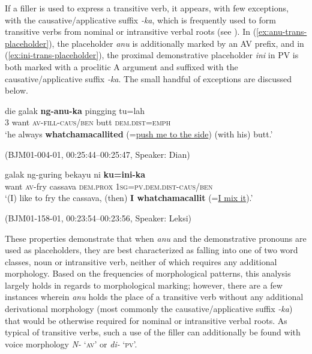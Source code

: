 \documentclass[output=paper,
\ChapterDOI{10.5281/zenodo.15697583}
colorlinks,
citecolor=brown]{langscibook}
\begin{document}
If a filler is used to express a transitive verb, it appears, with few exceptions, with the causative/applicative suffix \textit{-ka}, which is frequently used to form transitive verbs from nominal or intransitive verbal roots (see ). In (\ref{ex:anu-trans-placeholder}), the placeholder \textit{anu} is additionally marked by an AV prefix, and in (\ref{ex:ini-trans-placeholder}), the proximal demonstrative placeholder \textit{ini} in PV is both marked with a proclitic A argument and suffixed with the causative/applicative suffix \textit{-ka}. The small handful of exceptions are discussed below.


\begin{exe}
\ex\label{ex:anu-trans-placeholder} 
\begin{xlist}
\exi{}
\gll die galak \textbf{ng-anu-ka} pingging tu=lah\\
3 want \textsc{av-fill-caus/ben} butt \textsc{dem.dist=emph}\\
\trans `he always \textbf{whatchamacallited} (=\uline{push me to the side}) (with his) butt.'
\end{xlist}
\hfill (BJM01-004-01, 00:25:44--00:25:47, Speaker: Dian)
\end{exe}

% 

\begin{exe}
    \ex\label{ex:ini-trans-placeholder} 
    \begin{xlist}
        \exi{}
        \gll galak ng-guring bekayu ni \textbf{ku=ini-ka}\\
        want \textsc{av-}fry cassava \textsc{dem.prox} 1\textsc{sg=pv.dem.dist-caus/ben}\\
        \trans `(I) like to fry the cassava, (then) \textbf{I whatchamacallit} (=\uline{I mix it}).'
    \end{xlist}
    \hfill (BJM01-158-01, 00:23:54--00:23:56, Speaker: Leksi)
\end{exe}

These properties demonstrate that when \textit{anu} and the demonstrative pronouns are used as placeholders, they are best characterized as falling into one of two word classes, noun or intransitive verb, neither of which requires any additional morphology. Based on the frequencies of morphological patterns, this analysis largely holds in regards to morphological marking; however, there are a few instances wherein \textit{anu} holds the place of a transitive verb without any additional derivational morphology (most commonly the causative/applicative suffix \textit{-ka}) that would be otherwise required for nominal or intransitive verbal roots. As typical of transitive verbs, such a use of the filler can additionally be found with voice morphology \textit{N-} `\textsc{av}' or \textit{di-} `\textsc{pv}'.
\end{document}
